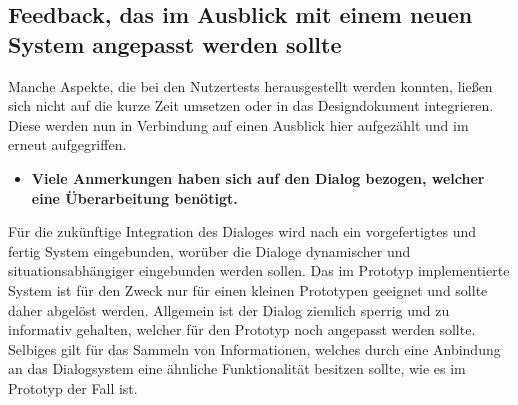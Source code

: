 



\subsection{Feedback, das im Ausblick mit einem neuen System angepasst werden sollte}
Manche Aspekte, die bei den Nutzertests herausgestellt werden konnten, ließen sich nicht auf die kurze Zeit umsetzen oder in das Designdokument integrieren. Diese werden nun in Verbindung auf einen Ausblick hier aufgezählt und im  erneut aufgegriffen.


\begin{itemize}  
    \item \textbf{Viele Anmerkungen haben sich auf den Dialog bezogen, welcher eine Überarbeitung benötigt.}
\end{itemize}

Für die zukünftige Integration des Dialoges wird nach ein vorgefertigtes und fertig System eingebunden, worüber die Dialoge dynamischer und situationsabhängiger eingebunden werden sollen. Das im Prototyp implementierte System ist für den Zweck nur für einen  kleinen Prototypen geeignet und sollte daher abgelöst werden. Allgemein ist der Dialog ziemlich sperrig und zu informativ gehalten, welcher für den Prototyp noch angepasst werden sollte. 
Selbiges gilt für das Sammeln von Informationen, welches durch eine Anbindung an das Dialogsystem eine ähnliche Funktionalität besitzen sollte, wie es im Prototyp der Fall ist.


